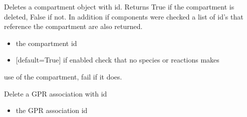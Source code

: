 \documentclass[letterpaper,10pt,english]{sphinxmanual}
\begin{document}
\begin{fulllineitems}
\begin{fulllineitems}
\end{fulllineitems}


\begin{fulllineitems}
\label{\detokenize{modules_doc:cbmpy.CBModel.Model.deleteCompartment}}
\pysigstartsignatures
{}
\pysigstopsignatures
\sphinxAtStartPar
Deletes a compartment object with id. Returns True if the compartment is deleted, False if not. In addition if components were checked
a list of id’s that reference the compartment are also returned.
\begin{itemize}
\item {} 
\sphinxAtStartPar
{} the compartment id

\item {} 
\sphinxAtStartPar
{} {[}default=True{]} if  enabled check that no species or reactions makes

\end{itemize}

\sphinxAtStartPar
use of the compartment, fail if it does.

\end{fulllineitems}


\begin{fulllineitems}
\label{\detokenize{modules_doc:cbmpy.CBModel.Model.deleteGPRAssociation}}
\pysigstartsignatures
{}
\pysigstopsignatures
\sphinxAtStartPar
Delete a GPR association with id
\begin{itemize}
\item {} 
\sphinxAtStartPar
{} the GPR association id

\end{itemize}

\end{fulllineitems}



\end{fulllineitems}
\end{document}
